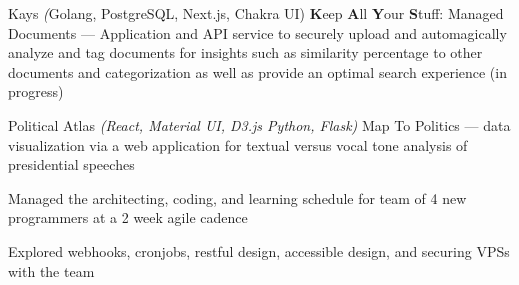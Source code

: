 

\begin{cventries}


\cventryproject
    {Kays} %
    {\emph(Golang, PostgreSQL, Next.js, Chakra UI)}
    {} %
    {\textbf{K}eep \textbf{A}ll \textbf{Y}our \textbf{S}tuff: Managed Documents --- Application and API service to securely upload and automagically analyze and tag documents for insights such as similarity percentage to other documents and categorization as well as provide an optimal search experience (in progress)} %
    {}

\cventryproject
    {Political Atlas} %
    {\emph{(React, Material UI, D3.js Python, Flask)}}
    {} %
    {Map To Politics --- data visualization via a web application for textual versus vocal tone analysis of presidential speeches} %
    {
      \begin{cvitems} %
        \item {Managed the architecting, coding, and learning schedule for team of 4 new programmers at a 2 week agile cadence}
        \item {Explored webhooks, cronjobs, restful design, accessible design, and securing VPSs with the team}
      \end{cvitems}
    }

\end{cventries}
